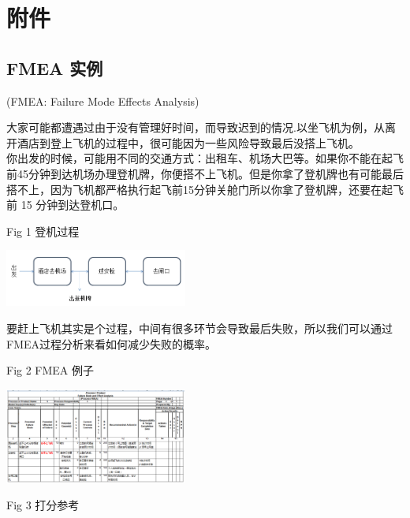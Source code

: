 \hypertarget{ux9644ux4ef6}{%
\section{附件}\label{ux9644ux4ef6}}

\hypertarget{fmea-ux5b9eux4f8b}{%
\subsection{FMEA 实例}\label{fmea-ux5b9eux4f8b}}

\begin{description}
\tightlist
\item[]
(FMEA: Failure Mode Effects Analysis)
\end{description}

大家可能都遭遇过由于没有管理好时间，而导致迟到的情况.以坐飞机为例，从离开酒店到登上飞机的过程中，很可能因为一些风险导致最后没搭上飞机。\\
你出发的时候，可能用不同的交通方式：出租车、机场大巴等。如果你不能在起飞前45分钟到达机场办理登机牌，你便搭不上飞机。但是你拿了登机牌也有可能最后搭不上，因为飞机都严格执行起飞前15分钟关舱门所以你拿了登机牌，还要在起飞前
15 分钟到达登机口。

Fig 1 登机过程


\includegraphics[width=6cm]{风险与机会1.png}


要赶上飞机其实是个过程，中间有很多环节会导致最后失败，所以我们可以通过FMEA过程分析来看如何减少失败的概率。

Fig 2 FMEA 例子


\includegraphics[width=6cm]{风险与机会2_FMEA.png}

Fig 3 打分参考


